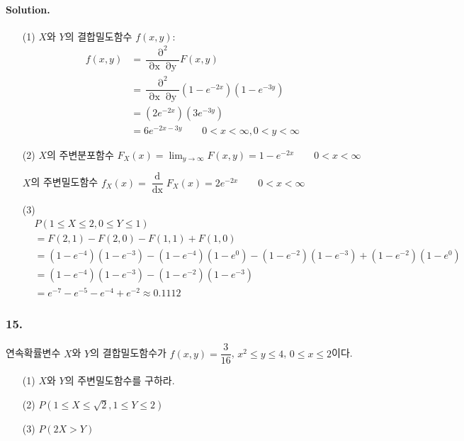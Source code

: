 \paragraph{Solution.}
\begin{itemize}
  \item [(1)] $X$와 $Y$의 결합밀도함수 $f\left(x, y\right)$:
\begin{align*}
	f\left(x, y\right) &= \dfrac{\mathop{\partial}^2}{\mathop{\partial x}\mathop{\partial y}} F\left(x, y\right) \\
	&= \dfrac{\mathop{\partial}^2}{\mathop{\partial x}\mathop{\partial y}} \left(1-e^{-2x}\right)\left(1-e^{-3y}\right)\\
	&= \left(2e^{-2x}\right)\left(3e^{-3y}\right)\\
	&= 6e^{-2x-3y} \qquad 0<x<\infty, 0<y<\infty
\end{align*}
  \item [(2)] $X$의 주변분포함수 $F_X\left(x\right) = \lim_{y\rightarrow\infty}F\left(x, y\right) = 1-e^{-2x} \qquad 0<x<\infty$
  
  $X$의 주변밀도함수 $f_X\left(x\right) = \dfrac{\mathop{d}}{\mathop{dx}} F_X\left(x\right) = 2e^{-2x} \qquad 0<x<\infty$\\
  
  \item [(3)]
\begin{align*}
	& P\left(1\leq X\leq 2, 0\leq Y\leq 1\right) \\
	&= F\left(2, 1\right) - F\left(2, 0\right) - F\left(1, 1\right) + F\left(1, 0\right)\\
	&= \left(1-e^{-4}\right)\left(1-e^{-3}\right) - \left(1-e^{-4}\right)\left(1-e^{0}\right) - \left(1-e^{-2}\right)\left(1-e^{-3}\right) + \left(1-e^{-2}\right)\left(1-e^{0}\right)\\
	&= \left(1-e^{-4}\right)\left(1-e^{-3}\right) - \left(1-e^{-2}\right)\left(1-e^{-3}\right)\\
	&= e^{-7} - e^{-5} - e^{-4} + e^{-2} \approx 0.1112
\end{align*}
\end{itemize}

\subsubsection{15.} 연속확률변수 $X$와 $Y$의 결합밀도함수가 $f\left(x, y\right) = \dfrac{3}{16}$, $x^2\leq y\leq 4$, $0\leq x\leq 2$이다.
\begin{itemize}
  \item [(1)] $X$와 $Y$의 주변밀도함수를 구하라.
  \item [(2)] $P\left(1\leq X\leq \sqrt{2}, 1\leq Y\leq 2\right)$
  \item [(3)] $P\left(2X > Y\right)$
\end{itemize}

